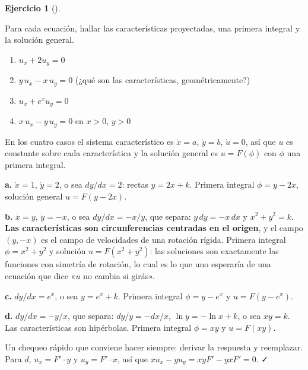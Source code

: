 \documentclass[
  spanish,
  a4paper,
]{scrbook}
\providecommand{\tightlist}{%
  \setlength{\itemsep}{0pt}\setlength{\parskip}{0pt}}
\theoremstyle{definition}
\theoremstyle{plain}
\theoremstyle{definition}
\theoremstyle{plain}
\theoremstyle{definition}
\newtheorem{exercise}{Ejercicio}[chapter]
\theoremstyle{remark}
\begin{document}
\begin{exercise}[]\protect\hypertarget{exr-caracteristicas-basicas}{}\label{exr-caracteristicas-basicas}

Para cada ecuación, hallar las características proyectadas, una primera
integral y la solución general.

\begin{enumerate}
\def\labelenumi{\alph{enumi}.}
\tightlist
\item
  \(u_x + 2u_y = 0\)
\item
  \(y\,u_x - x\,u_y = 0\) (¿qué son las características,
  geométricamente?)
\item
  \(u_x + e^{x}u_y = 0\)
\item
  \(x\,u_x - y\,u_y = 0\) en \(x>0\), \(y>0\)
\end{enumerate}

\end{exercise}

\begin{tcolorbox}[enhanced jigsaw, arc=.35mm, bottomrule=.15mm, bottomtitle=1mm, breakable, colback=white, colbacktitle=quarto-callout-tip-color!10!white, colframe=quarto-callout-tip-color-frame, coltitle=black, left=2mm, leftrule=.75mm, opacityback=0, opacitybacktitle=0.6, rightrule=.15mm, title=\textcolor{quarto-callout-tip-color}{\faLightbulb}\hspace{0.5em}{Solución}, titlerule=0mm, toprule=.15mm, toptitle=1mm]

En los cuatro casos el sistema característico es \(\dot x = a\),
\(\dot y = b\), \(\dot u = 0\), así que \(u\) es constante sobre cada
característica y la solución general es \(u = F(\phi)\) con \(\phi\) una
primera integral.

\textbf{a.} \(\dot x = 1\), \(\dot y = 2\), o sea \(dy/dx = 2\): rectas
\(y = 2x + k\). Primera integral \(\phi = y - 2x\), solución general
\(u = F(y-2x)\).

\textbf{b.} \(\dot x = y\), \(\dot y = -x\), o sea \(dy/dx = -x/y\), que
separa: \(y\,dy = -x\,dx\) y \(x^2+y^2 = k\). \textbf{Las
características son circunferencias centradas en el origen}, y el campo
\((y,-x)\) es el campo de velocidades de una rotación rígida. Primera
integral \(\phi = x^2+y^2\) y solución \(u = F(x^2+y^2)\): las
soluciones son exactamente las funciones con simetría de rotación, lo
cual es lo que uno esperaría de una ecuación que dice «\(u\) no cambia
si girás».

\textbf{c.} \(dy/dx = e^{x}\), o sea \(y = e^{x} + k\). Primera integral
\(\phi = y - e^{x}\) y \(u = F(y - e^{x})\).

\textbf{d.} \(dy/dx = -y/x\), que separa: \(dy/y = -dx/x\),
\(\ln y = -\ln x + k\), o sea \(xy = k\). Las características son
hipérbolas. Primera integral \(\phi = xy\) y \(u = F(xy)\).

Un chequeo rápido que conviene hacer siempre: derivar la respuesta y
reemplazar. Para \(d\), \(u_x = F'\cdot y\) y \(u_y = F'\cdot x\), así
que \(xu_x - yu_y = xyF' - yxF' = 0\). ✓

\end{tcolorbox}
\end{document}
